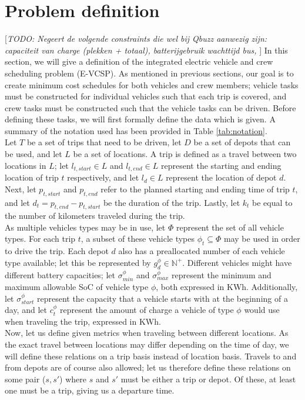 \documentclass[]{article}
\newcommand{\todo}[1]{{\color{red}[\textit{TODO: #1}]}}
\begin{document}
\section{Problem definition}
\label{sec:problem_def}
\todo{Negeert de volgende constraints die wel bij Qbuzz aanwezig zijn: capaciteit van charge (plekken + totaal), batterijgebruik wachttijd bus, }
In this section, we will give a definition of the integrated electric vehicle and crew scheduling problem (E-VCSP). As mentioned in previous sections, our goal is to create minimum cost schedules for both vehicles and crew members; vehicle tasks must be constructed for individual vehicles such that each trip is covered, and crew tasks must be constructed such that the vehicle tasks can be driven. Before defining these tasks, we will first formally define the data which is given. A summary of the notation used has been provided in Table \ref{tab:notation}. \\
Let $T$ be a set of trips that need to be driven, let $D$ be a set of depots that can be used, and let $L$ be a set of locations. A trip is defined as a travel between two locations in $L$; let $l_{t,start} \in L$ and $l_{t,end} \in L$ represent the starting and ending location of trip $t$ respectively, and let $l_d \in L$ represent the location of depot $d$. Next, let $p_{t,start}$ and $p_{t,end}$ refer to the planned starting and ending time of trip $t$, and let $d_t = p_{t,end} - p_{t,start}$ be the duration of the trip. Lastly, let $k_t$ be equal to the number of kilometers traveled during the trip. \\
As multiple vehicles types may be in use, let $\Phi$ represent the set of all vehicle types. For each trip $t$, a subset of these vehicle types $\phi_t \subseteq \Phi$ may be used in order to drive the trip. Each depot $d$ also has a preallocated number of each vehicle type available; let this be represented by $g^\phi_{d} \in \mathbb{N}^+$. Different vehicles might have different battery capacities; let $\sigma^\phi_{min}$ and $\sigma^\phi_{max}$ represent the minimum and maximum allowable SoC of vehicle type $\phi$, both expressed in KWh. Additionally, let $\sigma^\phi_{start}$ represent the capacity that a vehicle starts with at the beginning of a day, and let $c^\phi_t$ represent the amount of charge a vehicle of type $\phi$ would use when traveling the trip, expressed in KWh. \\
Now, let us define given metrics when traveling between different locations. As the exact travel between locations may differ depending on the time of day, we will define these relations on a trip basis instead of location basis. Travels to and from depots are of course also allowed; let us therefore define these relations on some pair ($s,s'$) where $s$ and $s'$ must be either a trip or depot. Of these, at least one must be a trip, giving us a departure time. \\
\end{document}
